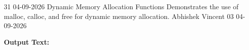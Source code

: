 \clearpage
\label{prog:31}
\programhead
  {31}
  {04-09-2026}
  {Dynamic Memory Allocation Functions}
  {Demonstrates the use of malloc, calloc, and free for dynamic memory allocation.}
  {Abhishek Vincent}
  {03}
  {04-09-2026}

\divider
\textbf{Output Text:}\par
\vspace{2pt}


